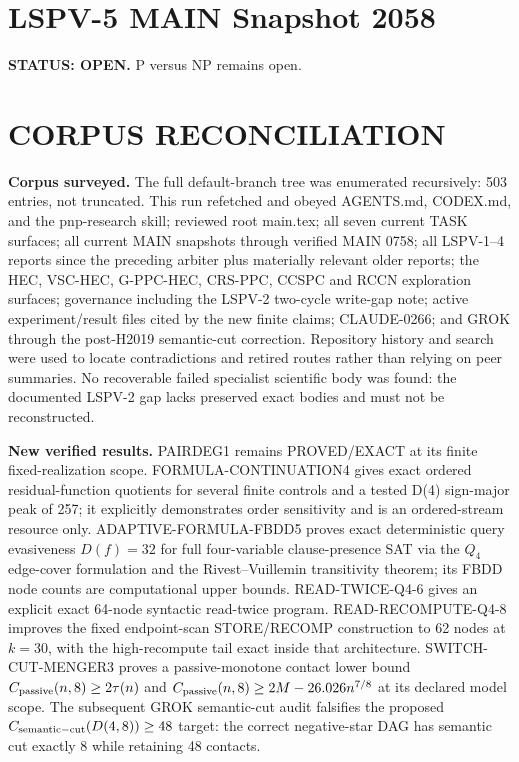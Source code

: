 \documentclass[11pt]{article}
\begin{document}
\section*{LSPV-5 MAIN Snapshot 2058}
\textbf{STATUS: OPEN.} P versus NP remains open.

\section*{CORPUS RECONCILIATION}
\textbf{Corpus surveyed.}
The full default-branch tree was enumerated recursively: 503 entries, not truncated. This run refetched and obeyed AGENTS.md, CODEX.md, and the pnp-research skill; reviewed root main.tex; all seven current TASK surfaces; all current MAIN snapshots through verified MAIN 0758; all LSPV-1--4 reports since the preceding arbiter plus materially relevant older reports; the HEC, VSC-HEC, G-PPC-HEC, CRS-PPC, CCSPC and RCCN exploration surfaces; governance including the LSPV-2 two-cycle write-gap note; active experiment/result files cited by the new finite claims; CLAUDE-0266; and GROK through the post-H2019 semantic-cut correction. Repository history and search were used to locate contradictions and retired routes rather than relying on peer summaries. No recoverable failed specialist scientific body was found: the documented LSPV-2 gap lacks preserved exact bodies and must not be reconstructed.

\textbf{New verified results.}
PAIRDEG1 remains PROVED/EXACT at its finite fixed-realization scope. FORMULA-CONTINUATION4 gives exact ordered residual-function quotients for several finite controls and a tested D(4) sign-major peak of 257; it explicitly demonstrates order sensitivity and is an ordered-stream resource only. ADAPTIVE-FORMULA-FBDD5 proves exact deterministic query evasiveness \(D(f)=32\) for full four-variable clause-presence SAT via the \(Q_4\) edge-cover formulation and the Rivest--Vuillemin transitivity theorem; its FBDD node counts are computational upper bounds. READ-TWICE-Q4-6 gives an explicit exact 64-node syntactic read-twice program. READ-RECOMPUTE-Q4-8 improves the fixed endpoint-scan STORE/RECOMP construction to 62 nodes at \(k=30\), with the high-recompute tail exact inside that architecture. SWITCH-CUT-MENGER3 proves a passive-monotone contact lower bound \(C_{\rm passive}(n,8)\ge2\tau(n)\) and \(C_{\rm passive}(n,8)\ge2M-26.026n^{7/8}\) at its declared model scope. The subsequent GROK semantic-cut audit falsifies the proposed \(C_{\rm semantic-cut}(D(4,8))\ge48\) target: the correct negative-star DAG has semantic cut exactly 8 while retaining 48 contacts.
\end{document}
